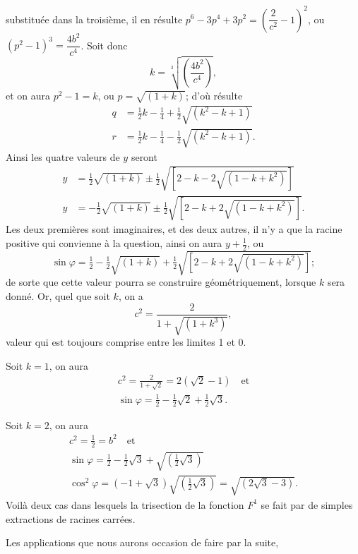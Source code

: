 \documentclass{article}
\begin{document}
substituée dans la troisième, il en résulte $p^{6}-3p^{4}+3p^{2}=\left(\dfrac{2}{c^{2}}-1\right)^{2}$, ou $(p^{2}-1)^{3}=\dfrac{4b^{2}}{c^{4}}$. Soit donc
\[ k=\sqrt[3]{\left(\frac{4b^{2}}{c^{4}}\right)}, \]
et on aura $p^{2}-1=k$, ou $p=\sqrt{(1+k)}$; d'où résulte
\[ \begin{aligned} q &= \tfrac{1}{2}k-\tfrac{1}{4}+\tfrac{1}{2}\sqrt{(k^{2}-k+1)} \\ r &= \tfrac{1}{2}k-\tfrac{1}{4}-\tfrac{1}{2}\sqrt{(k^{2}-k+1)}. \end{aligned} \]
Ainsi les quatre valeurs de $y$ seront
\[ \begin{aligned} y &= \tfrac{1}{2}\sqrt{(1+k)}\pm\tfrac{1}{2}\sqrt{[2-k-2\sqrt{(1-k+k^{2})}]} \\ y &= -\tfrac{1}{2}\sqrt{(1+k)}\pm\tfrac{1}{2}\sqrt{[2-k+2\sqrt{(1-k+k^{2})}]}. \end{aligned} \]
Les deux premières sont imaginaires, et des deux autres, il n'y a que la racine positive qui convienne à la question, ainsi on aura $y+\frac{1}{2}$, ou
\[ \sin\varphi=\tfrac{1}{2}-\tfrac{1}{2}\sqrt{(1+k)}+\tfrac{1}{2}\sqrt{[2-k+2\sqrt{(1-k+k^{2})}]}; \]
de sorte que cette valeur pourra se construire géométriquement, lorsque $k$ sera donné. Or, quel que soit $k$, on a
\[ c^{2}=\frac{2}{1+\sqrt{(1+k^{3})}}, \]
valeur qui est toujours comprise entre les limites 1 et 0.

Soit $k=1$, on aura
\[ \begin{gathered} c^{2}=\frac{2}{1+\sqrt{2}}=2(\sqrt{2}-1) \quad\text{et} \\ \sin\varphi=\tfrac{1}{2}-\tfrac{1}{2}\sqrt{2}+\tfrac{1}{2}\sqrt{3}. \end{gathered} \]

Soit $k=2$, on aura
\[ \begin{gathered} c^{2}=\tfrac{1}{2}=b^{2} \quad\text{et} \\ \sin\varphi=\tfrac{1}{2}-\tfrac{1}{2}\sqrt{3}+\sqrt{(\tfrac{1}{2}\sqrt{3})} \\ \cos^{2}\varphi=(-1+\sqrt{3})\sqrt{(\tfrac{1}{2}\sqrt{3})}=\sqrt{(2\sqrt{3}-3)}. \end{gathered} \]
 Voilà deux cas dans lesquels la trisection de la fonction $F^{1}$ se fait par de simples extractions de racines carrées.

Les applications que nous aurons occasion de faire par la suite,
\end{document}
